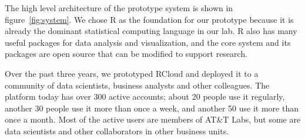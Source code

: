 The high level architecture of the prototype system
is shown in figure~\ref{fig:system}.
We chose R as the foundation for our prototype because it is already
the dominant statistical computing language in our lab.
R also has many useful packages for data analysis and visualization,
and the core system and its packages are open source that can be modified to
support research. 

Over the past three years, we prototyped RCloud and deployed it to
a community of data scientists, business analysts and other colleagues. The
platform today has over 300 active accounts; about 20 people use it regularly,
another 30 people use it more than once a week, and another 50 use it more than
once a month. Most of the
active users are members of AT\&T Labs, but some are data scientists and other
collaborators in other business units.

